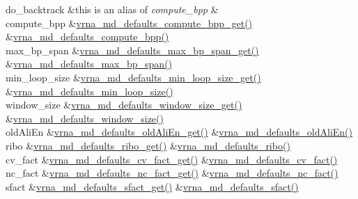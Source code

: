\begin{DoxyRefList}
\begin{longtabu}
do\+\_\+backtrack  &this is an alias of {\itshape compute\+\_\+bpp}  &\\
compute\+\_\+bpp  &\mbox{\hyperlink{group__model__details_gaa3a537e61fbe0518673bf9f73fd820f3}{vrna\+\_\+md\+\_\+defaults\+\_\+compute\+\_\+bpp\+\_\+get()}}  &\mbox{\hyperlink{group__model__details_gaf1b5db10f1f476767f9a95f8a78e3132}{vrna\+\_\+md\+\_\+defaults\+\_\+compute\+\_\+bpp()}}   \\
max\+\_\+bp\+\_\+span  &\mbox{\hyperlink{group__model__details_gaa60f989e062fecd4d4bac89c1883da85}{vrna\+\_\+md\+\_\+defaults\+\_\+max\+\_\+bp\+\_\+span\+\_\+get()}}  &\mbox{\hyperlink{group__model__details_ga4c4bc962f09b4480cb8499f1cf8ae4ec}{vrna\+\_\+md\+\_\+defaults\+\_\+max\+\_\+bp\+\_\+span()}}   \\
min\+\_\+loop\+\_\+size  &\mbox{\hyperlink{group__model__details_ga5cc691174a75c652807dc361b617632a}{vrna\+\_\+md\+\_\+defaults\+\_\+min\+\_\+loop\+\_\+size\+\_\+get()}}  &\mbox{\hyperlink{group__model__details_gac152f1e78c1058a10261022c8dfda0f7}{vrna\+\_\+md\+\_\+defaults\+\_\+min\+\_\+loop\+\_\+size()}}   \\
window\+\_\+size  &\mbox{\hyperlink{group__model__details_ga670146a9aa3ba77f4d422d60b7c30ac9}{vrna\+\_\+md\+\_\+defaults\+\_\+window\+\_\+size\+\_\+get()}}  &\mbox{\hyperlink{group__model__details_ga7b802ce0e8c3181bf5cb580de6d5b26a}{vrna\+\_\+md\+\_\+defaults\+\_\+window\+\_\+size()}}   \\
old\+Ali\+En  &\mbox{\hyperlink{group__model__details_ga2374492b5019df88022fe4c05f0f3630}{vrna\+\_\+md\+\_\+defaults\+\_\+old\+Ali\+En\+\_\+get()}}  &\mbox{\hyperlink{group__model__details_ga41521d5b9fb7e0f31e7ea73f5792afab}{vrna\+\_\+md\+\_\+defaults\+\_\+old\+Ali\+En()}}   \\
ribo  &\mbox{\hyperlink{group__model__details_ga169027f0c0561ea7d87b655e4b336bfc}{vrna\+\_\+md\+\_\+defaults\+\_\+ribo\+\_\+get()}}  &\mbox{\hyperlink{group__model__details_ga937c45e1d06fd6168730a9b08d130be3}{vrna\+\_\+md\+\_\+defaults\+\_\+ribo()}}   \\
cv\+\_\+fact  &\mbox{\hyperlink{group__model__details_gae59c68393807217b0a2497adb64d3ee3}{vrna\+\_\+md\+\_\+defaults\+\_\+cv\+\_\+fact\+\_\+get()}}  &\mbox{\hyperlink{group__model__details_gad3a3f40baafd91a6ce80a91a68e20053}{vrna\+\_\+md\+\_\+defaults\+\_\+cv\+\_\+fact()}}   \\
nc\+\_\+fact  &\mbox{\hyperlink{group__model__details_ga7ac759eaa7159bf5f022745f5da59508}{vrna\+\_\+md\+\_\+defaults\+\_\+nc\+\_\+fact\+\_\+get()}}  &\mbox{\hyperlink{group__model__details_gac35e596c850dce3ad55c49119fd7d471}{vrna\+\_\+md\+\_\+defaults\+\_\+nc\+\_\+fact()}}   \\
sfact  &\mbox{\hyperlink{group__model__details_gab2df6aab954b63fd3592d18e90285dae}{vrna\+\_\+md\+\_\+defaults\+\_\+sfact\+\_\+get()}}  &\mbox{\hyperlink{group__model__details_ga3f73d3029d3d0025d4cc311510cd95a3}{vrna\+\_\+md\+\_\+defaults\+\_\+sfact()}}   \\
\end{longtabu}




\end{DoxyRefList}
